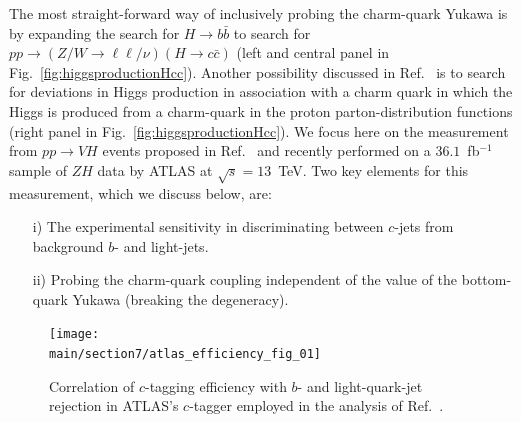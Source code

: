 \documentclass[../report.tex]{subfiles}
\providecommand{\main}{..}
\begin{document}
The most straight-forward way of inclusively probing the charm-quark Yukawa is by 
expanding the search for $H\to b\bar b$ to search for 
$pp \to (Z/W\to\ell\ell/\nu) (H\to c\bar c)$ \cite{Perez:2015aoa}
(left and central panel in Fig.~\ref{fig:higgsproductionHcc}).
Another possibility discussed in Ref.~\cite{Brivio:2015fxa} is to search for deviations in Higgs production 
in association with a charm quark in which the Higgs is produced from a charm-quark in the proton 
parton-distribution functions (right panel in Fig.~\ref{fig:higgsproductionHcc}).
We focus here on the measurement from $pp\to VH$ events proposed in Ref.~\cite{Perez:2015aoa}
and recently performed on a $36.1$~fb$^{-1}$ sample of $ZH$ data by ATLAS \cite{Aaboud:2018fhh}
at $\sqrt{s}=13$~TeV.
Two key elements for this measurement, which we discuss below, are:
\begin{itemize}
	\item[i)] The experimental sensitivity in discriminating between $c$-jets from
		background $b$- and light-jets.
	\item[ii)] Probing the charm-quark coupling independent of the value of the 
		bottom-quark Yukawa (breaking the degeneracy).
\end{itemize}

\begin{figure}[h]
	\centering
	\texttt{[image: \\main/section7/atlas\_efficiency\_fig\_01]}
	\caption{Correlation of $c$-tagging efficiency with $b$- and light-quark-jet rejection
	in ATLAS's $c$-tagger employed in the analysis of Ref.~\cite{Aaboud:2018fhh}.
\label{fig:ATLASctagefficiency}}
\end{figure}
\end{document}
